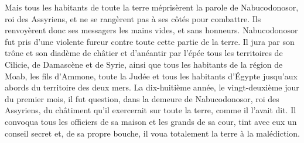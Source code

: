 Mais tous les habitants de toute la terre
		méprisèrent la parole de Nabucodonosor, roi des Assyriens,
	et ne se rangèrent pas à ses côtés pour combattre.
Ils renvoyèrent donc ses messagers les mains vides, et sans honneurs.
Nabucodonosor fut pris d'une violente fureur contre toute cette partie de la terre.
	Il jura par son trône et son diadème de châtier et d'anéantir par l'épée
	tous les territoires de Cilicie, de Damascène et de Syrie,
	ainsi que tous les habitants de la région de Moab, les fils d'Ammone, toute la Judée
	et tous les habitants d'Égypte jusqu'aux abords du territoire des deux mers.
La dix-huitième année, le vingt-deuxième jour du premier mois,
	il fut question, dans la demeure de Nabucodonosor, roi des Assyriens,
	du châtiment qu'il exercerait sur toute la terre, comme il l'avait dit.
Il convoqua tous les officiers de sa maison et les grands de sa cour,
	tint avec eux un conseil secret
	et, de sa propre bouche, il voua totalement la terre à la malédiction.
